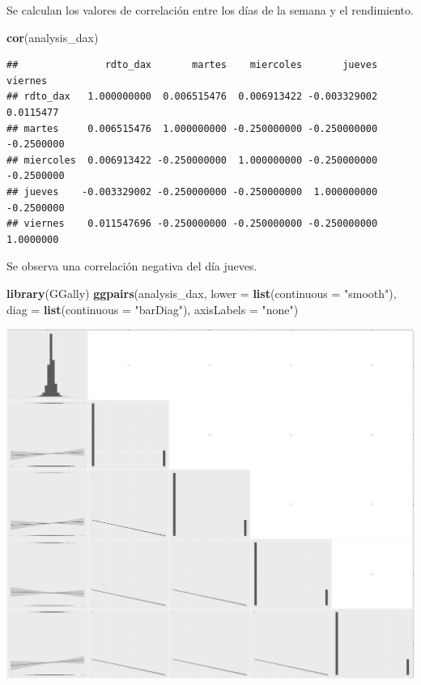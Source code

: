 \documentclass[
  11pt,
]{article}
\newenvironment{Shaded}{\begin{snugshade}}{\end{snugshade}}
\newcommand{\DataTypeTok}[1]{\textcolor[rgb]{0.13,0.29,0.53}{#1}}
\newcommand{\KeywordTok}[1]{\textcolor[rgb]{0.13,0.29,0.53}{\textbf{#1}}}
\newcommand{\NormalTok}[1]{#1}
\newcommand{\StringTok}[1]{\textcolor[rgb]{0.31,0.60,0.02}{#1}}
\begin{document}
Se calculan los valores de correlación entre los días de la semana y el
rendimiento.

\begin{Shaded}
\begin{Highlighting}[]
\KeywordTok{cor}\NormalTok{(analysis_dax)}
\end{Highlighting}
\end{Shaded}

\begin{verbatim}
##               rdto_dax       martes    miercoles       jueves    viernes
## rdto_dax   1.000000000  0.006515476  0.006913422 -0.003329002  0.0115477
## martes     0.006515476  1.000000000 -0.250000000 -0.250000000 -0.2500000
## miercoles  0.006913422 -0.250000000  1.000000000 -0.250000000 -0.2500000
## jueves    -0.003329002 -0.250000000 -0.250000000  1.000000000 -0.2500000
## viernes    0.011547696 -0.250000000 -0.250000000 -0.250000000  1.0000000
\end{verbatim}

Se observa una correlación negativa del día jueves.

\begin{Shaded}
\begin{Highlighting}[]
\KeywordTok{library}\NormalTok{(GGally)}
\KeywordTok{ggpairs}\NormalTok{(analysis_dax, }\DataTypeTok{lower =} \KeywordTok{list}\NormalTok{(}\DataTypeTok{continuous =} \StringTok{"smooth"}\NormalTok{),}
        \DataTypeTok{diag =} \KeywordTok{list}\NormalTok{(}\DataTypeTok{continuous =} \StringTok{"barDiag"}\NormalTok{), }\DataTypeTok{axisLabels =} \StringTok{"none"}\NormalTok{)}
\end{Highlighting}
\end{Shaded}

\includegraphics[width=0.9\linewidth]{RmdFigs/unnamed-chunk-5-1}
\end{document}
